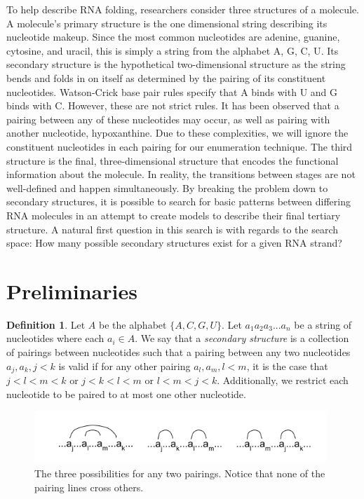 \documentclass[11pt]{amsart}
\theoremstyle{plain}%
\theoremstyle{definition}
\newtheorem{defin}[thm]{{Definition}}
\theoremstyle{remark}
\numberwithin{equation}{thm}
\begin{document}
To help describe RNA folding, researchers consider three structures of a molecule. A molecule's primary structure is the one dimensional string describing its nucleotide makeup. Since the most common nucleotides are adenine, guanine, cytosine, and uracil, this is simply a string from the alphabet {A, G, C, U}. Its secondary structure is the hypothetical two-dimensional structure as the string bends and folds in on itself as determined by the pairing of its constituent nucleotides. Watson-Crick base pair rules specify that A binds with U and G binds with C. However, these are not strict rules. It has been observed that a pairing between any of these nucleotides may occur, as well as pairing with another nucleotide, hypoxanthine. Due to these complexities, we will ignore the constituent nucleotides in each pairing for our enumeration technique. The third structure is the final, three-dimensional structure that encodes the functional information about the molecule. In reality, the transitions between stages are not well-defined and happen simultaneously. By breaking the problem down to secondary structures, it is possible to search for basic patterns between differing RNA molecules in an attempt to create models to describe their final tertiary structure. A natural first question in this search is with regards to the search space: How many possible secondary structures exist for a given RNA strand?

\section{Preliminaries}
\begin{defin}
    Let $A$ be the alphabet $\{A, C, G, U\}$. Let $a_1a_2a_3...a_n$ be a string of nucleotides where each $a_i \in A$. We say that a \textit{secondary structure} is a collection of pairings between nucleotides such that a pairing between any two nucleotides $a_j, a_k, j < k$ is valid if for any other pairing $a_l, a_m, l < m$, it is the case that $j < l < m < k$ or $j < k < l < m$ or $l < m < j < k$. Additionally, we restrict each nucleotide to be paired to at most one other nucleotide.
\end{defin}

\begin{figure}[htp]
    \centering
    \includegraphics[width=11cm]{PairingDef.png}
    \caption{The three possibilities for any two pairings. Notice that none of the pairing lines cross others.}
    \label{fig:definition}
\end{figure}
\end{document}
